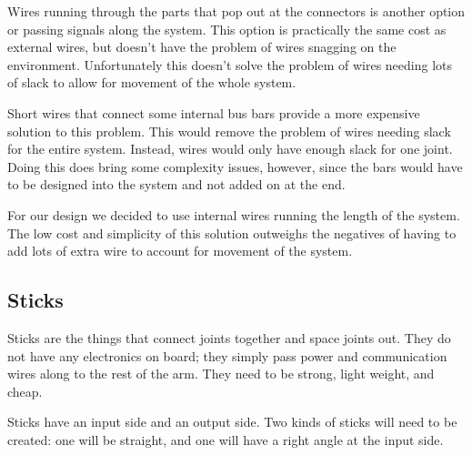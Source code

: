 \noindent Wires running through the parts that pop out at the connectors is another option or passing signals along the system. This option is practically the same cost as external wires, but doesn't have the problem of wires snagging on the environment. Unfortunately this doesn't solve the problem of wires needing lots of slack to allow for movement of the whole system. 

\noindent Short wires that connect some internal bus bars provide a more expensive solution to this problem. This would remove the problem of wires needing slack for the entire system. Instead, wires would only have enough slack for one joint. Doing this does bring some complexity issues, however, since the bars would have to be designed into the system and not added on at the end. 

\noindent For our design we decided to use internal wires running the length of the system. The low cost and simplicity of this solution outweighs the negatives of having to add lots of extra wire to account for movement of the system.

\subsection{Sticks}

Sticks are the things that connect joints together and space joints out. They do not have any electronics on board; they simply pass power and communication wires along to the rest of the arm. They need to be strong, light weight, and cheap.

\noindent Sticks have an input side and an output side. Two kinds of sticks will need to be created: one will be straight, and one will have a right angle at the input side.

\FPeval{\runCount}{\startNum}

